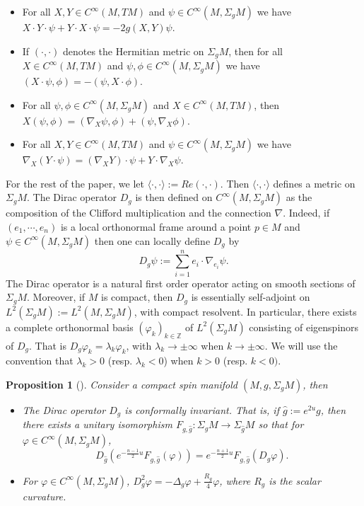 \documentclass[11pt]{article}
\newtheorem{proposition}{Proposition}[section]
\def \Z {\mathbb{Z}}
\begin{document}
{\begin{itemize}
\item For all $X, Y \in C^{\infty}(M,TM)$ and $\psi \in C^{\infty}(M,\Sigma_{g} M)$ we have $X\cdot Y \cdot \psi +Y\cdot X \cdot \psi=-2g(X,Y)\psi$. 
\item If $(\cdot,\cdot)$ denotes the Hermitian metric on $\Sigma_{g} M$, then for all $X \in C^{\infty}(M,TM)$ and $\psi, \phi \in C^{\infty}(M,\Sigma_{g} M)$ we have $(X\cdot \psi , \phi)=-(\psi, X\cdot \phi)$.
\item For all $\psi, \phi \in C^{\infty}(M,\Sigma_{g} M)$ and $X\in C^{\infty}(M,TM)$, then $X(\psi,\phi)=(\nabla_{X}\psi,\phi)+(\psi,\nabla_{X} \phi)$.
\item For all $X, Y \in C^{\infty}(M,TM)$ and $\psi \in C^{\infty}(M,\Sigma_{g} M)$ we have $\nabla_{X} (Y\cdot \psi)=(\nabla_{X}Y)\cdot \psi+Y\cdot \nabla_{X}\psi$.
\end{itemize}

\noindent
For the rest of the paper, we let $\langle \cdot, \cdot \rangle:= Re (\cdot,\cdot)$. Then $\langle \cdot, \cdot \rangle$ defines a metric on $\Sigma_{g} M$.
The Dirac operator $D_{g}$ is then defined on $C^{\infty}(M,\Sigma_{g} M)$ as the composition of the Clifford multiplication and the connection $\nabla$. Indeed, if $(e_{1}, \cdots, e_{n})$ is a local orthonormal frame around a point $p\in M$ and $\psi \in C^{\infty}(M,\Sigma_{g} M)$ then one can locally define $D_{g}$ by  
$$D_{g}\psi :=\sum_{i=1}^{n}e_{i}\cdot \nabla_{e_{i}} \psi.$$
The Dirac operator is a natural first order operator acting on smooth sections of $\Sigma_{g} M$. Moreover, if $M$ is compact, then $D_{g}$ is essentially self-adjoint on $L^{2}(\Sigma_{g} M):=L^{2}(M,\Sigma_{g} M)$, with compact resolvent. In particular, there exists a complete orthonormal basis $(\varphi_{k})_{k\in \Z}$ of $L^{2}(\Sigma_{g} M)$ consisting of eigenspinors of $D_{g}$. That is $D_{g}\varphi_{k}=\lambda_{k}\varphi_{k}$, with $\lambda_{k}\to \pm \infty$ when $k\to \pm \infty$. We will use the convention that $\lambda_{k}>0$ (resp. $\lambda_{k}<0$) when $k>0$ (resp. $k<0)$.

\begin{proposition}[\cite{Bour, Friedrich2000}]
Consider a compact spin manifold $(M,g,\Sigma_{g}M)$, then
\begin{itemize}
\item[i)] The Dirac operator $D_{g}$ is conformally invariant. That is, if $\hat{g}:=e^{2u}g$, then there exists a unitary isomorphism $F_{g,\hat{g}}:\Sigma_{g}M \to \Sigma_{\hat{g}}M$ so that for $\varphi \in C^{\infty}(M,\Sigma_{g}M)$, $$D_{\hat{g}}(e^{-\frac{n-1}{2}u}F_{g,\hat{g}}(\varphi))=e^{-\frac{n+1}{2}u}F_{g,\hat{g}}(D_{g}\varphi).$$
\item[ii)] For $\varphi \in C^{\infty}(M,\Sigma_{g}M)$, $D_{g}^{2}\varphi =-\Delta_{g}\varphi +\frac{R_{g}}{4}\varphi$, where $R_{g}$ is the scalar curvature. 
\end{itemize}
\end{proposition}

}
\end{document}
